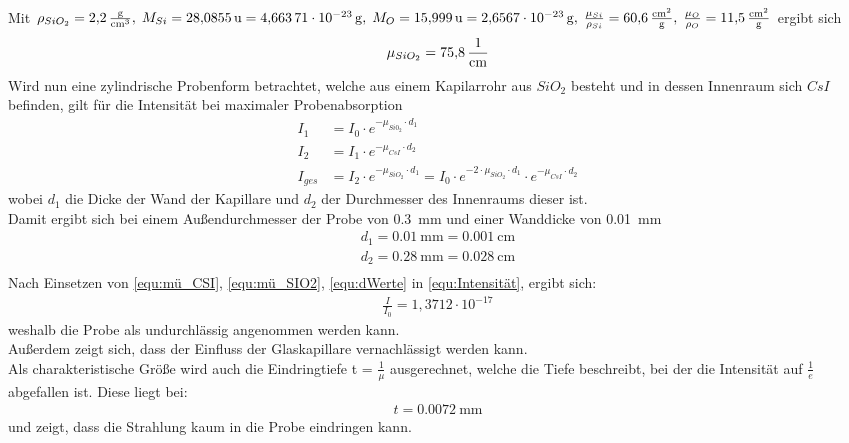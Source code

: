 \documentclass[a4paper,twoside,final]{article}
\begin{document}
Mit
$\rho_{SiO_2} = \SI{2,2}{\frac{\gram}{\centi\meter\cubed}},\; M_{Si} = \SI{28,0855}{\text{u}}=\SI{4,66371E-23}{\gram},\; M_{O} = \SI{15,999}{\text{u}}=\SI{2,6567E-23
}{\gram},\; \frac{\mu_{Si}}{\rho_{Si}} = \SI{60,6}{\frac{\centi\meter\squared}{\gram}}, \;\frac{\mu_{O}}{\rho_{O}} = \SI{11,5}{\frac{\centi\meter\squared}{\gram}} $
ergibt sich
\begin{align}\label{equ:mü_SIO2}
\mu_{SiO_2}= \SI{75,8}{\frac{1}{\centi\meter}}
\end{align}
Wird nun eine zylindrische Probenform betrachtet, welche aus einem Kapilarrohr aus $SiO_2$ besteht und in dessen Innenraum sich $CsI$ befinden, gilt für die Intensität bei maximaler Probenabsorption
\begin{align}\label{equ:Intensität}
  I_1 &= I_0 \cdot e^{-\mu_{Si0_2}\cdot d_1} \nonumber\\
  I_2 &= I_1 \cdot e^{-\mu_{CsI}\cdot d_2}\nonumber \\
  I_{ges}& = I_2 \cdot e^{-\mu_{SiO_2}\cdot d_1} = I_0 \cdot e^{-2\cdot\mu_{SiO_2}\cdot d_1}\cdot e^{-\mu_{CsI}\cdot d_2}
\end{align}
wobei $d_1$ die Dicke der Wand der Kapillare und $d_2$ der Durchmesser des Innenraums dieser ist. \\
Damit ergibt sich bei einem Außendurchmesser der Probe von \SI{0,3}{\milli\meter} und einer Wanddicke von \SI{0,01}{\milli\meter}
\begin{align}\label{equ:dWerte}
  d_1 = \SI{0,01}{\milli\meter}=\SI{0,001}{\centi\meter}\\
  d_2 = \SI{0,28}{\milli\meter}=\SI{0,028}{\centi\meter}\\
\end{align}
Nach Einsetzen von \ref{equ:mü_CSI}, \ref{equ:mü_SIO2}, \ref{equ:dWerte} in \ref{equ:Intensität}, ergibt sich:
\begin{align}
  \frac{I}{I_0} = 1,3712\cdot 10^{-17}
\end{align}
weshalb die Probe als undurchlässig angenommen werden kann.\\
Außerdem zeigt sich, dass der Einfluss der Glaskapillare vernachlässigt werden kann.\\
Als charakteristische Größe wird auch die Eindringtiefe t = $\frac{1}{\mu}$ ausgerechnet, welche die Tiefe beschreibt, bei der die Intensität auf $\frac{1}{e}$ abgefallen ist.  Diese liegt bei:
\begin{align}
  t = \SI{0,0072}{\milli\meter}
\end{align}
und zeigt, dass die Strahlung kaum in die Probe eindringen kann.
\end{document}
